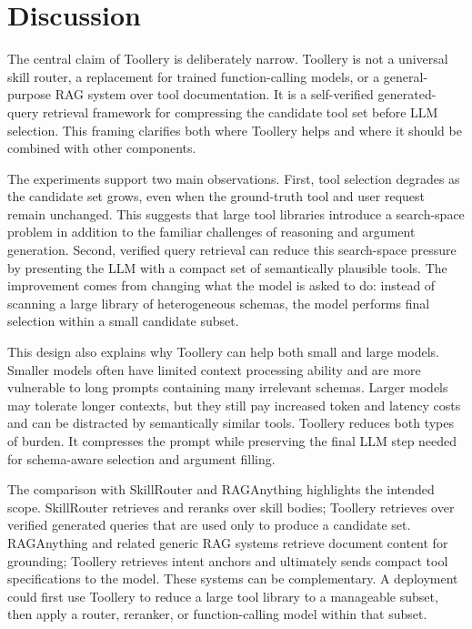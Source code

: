 \section{Discussion}
\label{sec:discussion_draft}

The central claim of Toollery is deliberately narrow. Toollery is not a universal skill router, a replacement for trained function-calling models, or a general-purpose RAG system over tool documentation. It is a self-verified generated-query retrieval framework for compressing the candidate tool set before LLM selection. This framing clarifies both where Toollery helps and where it should be combined with other components.

The experiments support two main observations. First, tool selection degrades as the candidate set grows, even when the ground-truth tool and user request remain unchanged. This suggests that large tool libraries introduce a search-space problem in addition to the familiar challenges of reasoning and argument generation. Second, verified query retrieval can reduce this search-space pressure by presenting the LLM with a compact set of semantically plausible tools. The improvement comes from changing what the model is asked to do: instead of scanning a large library of heterogeneous schemas, the model performs final selection within a small candidate subset.

This design also explains why Toollery can help both small and large models. Smaller models often have limited context processing ability and are more vulnerable to long prompts containing many irrelevant schemas. Larger models may tolerate longer contexts, but they still pay increased token and latency costs and can be distracted by semantically similar tools. Toollery reduces both types of burden. It compresses the prompt while preserving the final LLM step needed for schema-aware selection and argument filling.

The comparison with SkillRouter and RAGAnything highlights the intended scope. SkillRouter retrieves and reranks over skill bodies; Toollery retrieves over verified generated queries that are used only to produce a candidate set. RAGAnything and related generic RAG systems retrieve document content for grounding; Toollery retrieves intent anchors and ultimately sends compact tool specifications to the model. These systems can be complementary. A deployment could first use Toollery to reduce a large tool library to a manageable subset, then apply a router, reranker, or function-calling model within that subset.

